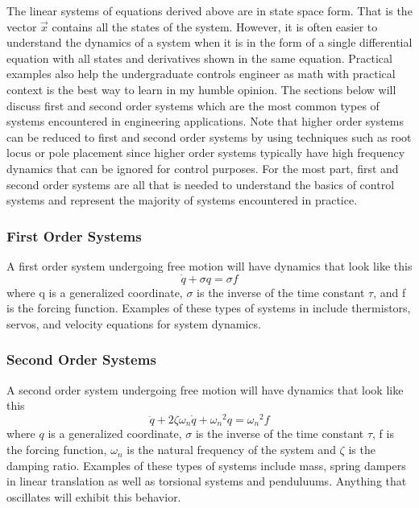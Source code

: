 The linear systems of equations derived above are in state space form. That is the vector $\vec{x}$ contains all the states of the system. However, it is often easier to understand the dynamics of a system when it is in the form of a single differential equation with all states and derivatives shown in the same equation. Practical examples also help the undergraduate controls engineer as math with practical context is the best way to learn in my humble opinion. The sections below will discuss first and second order systems which are the most common types of systems encountered in engineering applications. Note that higher order systems can be reduced to first and second order systems by using techniques such as root locus or pole placement since higher order systems typically have high frequency dynamics that can be ignored for control purposes. For the most part, first and second order systems are all that is needed to understand the basics of control systems and represent the majority of systems encountered in practice.

\subsubsection{First Order Systems}

A first order system undergoing free motion will have dynamics that look like this
\begin{equation} \label{e:first_order}
\dot{q} + \sigma q = \sigma f
\end{equation}
\noindent where q is a generalized coordinate, $\sigma$ is the inverse of the time constant $\tau$, and f is the forcing function. Examples of these types of systems in include thermistors, servos, and velocity equations for system dynamics. 

\subsubsection{Second Order Systems}

A second order system undergoing free motion will have dynamics that look like this
\begin{equation}\label{e:second_order}
\ddot{q} + 2\zeta \omega_n \dot{q} + {\omega_n}^2 q = {\omega_n}^2 f
\end{equation}
where $q$ is a generalized coordinate, $\sigma$ is the inverse of the time constant $\tau$, f is the forcing function, $\omega_n$ is the natural frequency of the system and $\zeta$ is the damping ratio. Examples of these types of systems include mass, spring dampers in linear translation as well as torsional systems and penduluums. Anything that oscillates will exhibit this behavior. 

